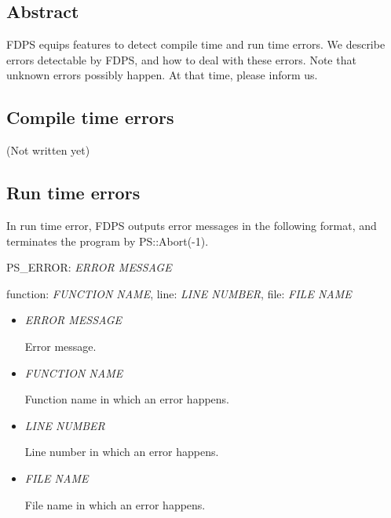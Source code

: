 \subsection{Abstract}

FDPS equips features to detect compile time and run time errors. We
describe errors detectable by FDPS, and how to deal with these
errors. Note that unknown errors possibly happen. At that time, please
inform us.

\subsection{Compile time errors}

(Not written yet)

\subsection{Run time errors}

In run time error, FDPS outputs error messages in the following
format, and terminates the program by PS::Abort(-1).

\begin{screen}
  PS\_ERROR: \textit{ERROR MESSAGE}
  
  function: \textit{FUNCTION NAME}, line: \textit{LINE NUMBER}, file:
  \textit{FILE NAME}
\end{screen}

\begin{itemize}
\item \textit{ERROR MESSAGE}

  Error message.

\item \textit{FUNCTION NAME}

  Function name in which an error happens.

\item \textit{LINE NUMBER}

  Line number in which an error happens.
  
\item \textit{FILE NAME}

  File name in which an error happens.
    
\end{itemize}

